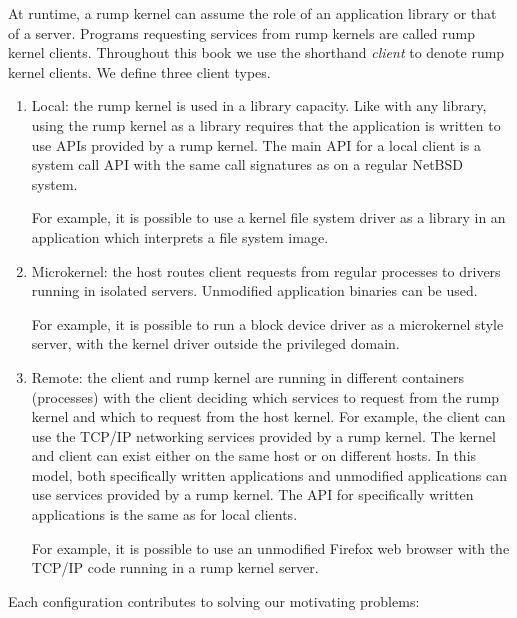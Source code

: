 At runtime, a rump kernel can assume the role of an application library
or that of a server.  Programs requesting services from rump kernels
are called rump kernel clients.  Throughout this book we use
the shorthand \textit{client} to denote rump kernel clients.
We define three client types.

\begin{enumerate}
\item	Local: the rump kernel is used in a library capacity.
	Like with any library, using the rump kernel as a library requires
	that the application is written to use APIs provided by a rump
	kernel.  The main API for a local client is a system call API
	with the same call signatures as on a regular NetBSD system.

	For example, it is possible to use a kernel file system driver as
	a library in an application which interprets a file system image.

\item   Microkernel: the host routes client requests from regular
	processes to drivers running in isolated servers.
	Unmodified application binaries can be used.

	For example, it is possible to run a block device driver as a
	microkernel style server, with the kernel driver outside the
	privileged domain.

\item   Remote: the client and rump kernel are running in
	different containers (processes) with the client deciding
	which services to request from the rump kernel and which to
	request from the host kernel.  For example, the client can
	use the TCP/IP networking services provided by a rump
	kernel.  The kernel and client can exist either on the same
	host or on different hosts.  In this model, both
	specifically written applications and unmodified applications
	can use services provided by a rump kernel.  The API for
	specifically written applications is the same as for local
	clients.

	For example, it is possible to use an unmodified Firefox web
	browser with the TCP/IP code running in a rump kernel server.
\end{enumerate}

Each configuration contributes to solving our motivating problems:

